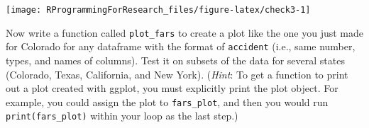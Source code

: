\documentclass[]{book}
\makeatletter
\newenvironment{Shaded}{\begin{snugshade}}{\end{snugshade}}
\newcommand{\KeywordTok}[1]{\textcolor[rgb]{0.13,0.29,0.53}{\textbf{#1}}}
\newcommand{\DataTypeTok}[1]{\textcolor[rgb]{0.13,0.29,0.53}{#1}}
\newcommand{\DecValTok}[1]{\textcolor[rgb]{0.00,0.00,0.81}{#1}}
\newcommand{\CharTok}[1]{\textcolor[rgb]{0.31,0.60,0.02}{#1}}
\newcommand{\StringTok}[1]{\textcolor[rgb]{0.31,0.60,0.02}{#1}}
\newcommand{\OperatorTok}[1]{\textcolor[rgb]{0.81,0.36,0.00}{\textbf{#1}}}
\newcommand{\NormalTok}[1]{#1}
\newenvironment{kframe}{%
\medskip{}
\setlength{\fboxsep}{.8em}
 \def\at@end@of@kframe{}%
 \ifinner\ifhmode%
  \def\at@end@of@kframe{\end{minipage}}%
  \begin{minipage}{\columnwidth}%
 \fi\fi%
 \def\FrameCommand##1{\hskip\@totalleftmargin \hskip-\fboxsep
 \colorbox{shadecolor}{##1}\hskip-\fboxsep
     \hskip-\linewidth \hskip-\@totalleftmargin \hskip\columnwidth}%
 \MakeFramed {\advance\hsize-\width
   \@totalleftmargin\z@ \linewidth\hsize
   \@setminipage}}%
 {\par\unskip\endMakeFramed%
 \at@end@of@kframe}
\renewenvironment{Shaded}{\begin{kframe}}{\end{kframe}}
\theoremstyle{definition}
\theoremstyle{definition}
\theoremstyle{definition}
\theoremstyle{remark}
\makeatother
\begin{document}
\begin{Shaded}
\end{Shaded}

\begin{center}\texttt{[image: RProgrammingForResearch\_files/figure-latex/check3-1]} \end{center}

Now write a function called \texttt{plot\_fars} to create a plot like
the one you just made for Colorado for any dataframe with the format of
\texttt{accident} (i.e., same number, types, and names of columns). Test
it on subsets of the data for several states (Colorado, Texas,
California, and New York). (\emph{Hint}: To get a function to print out
a plot created with ggplot, you must explicitly print the plot object.
For example, you could assign the plot to \texttt{fars\_plot}, and then
you would run \texttt{print(fars\_plot)} within your loop as the last
step.)
\end{document}
